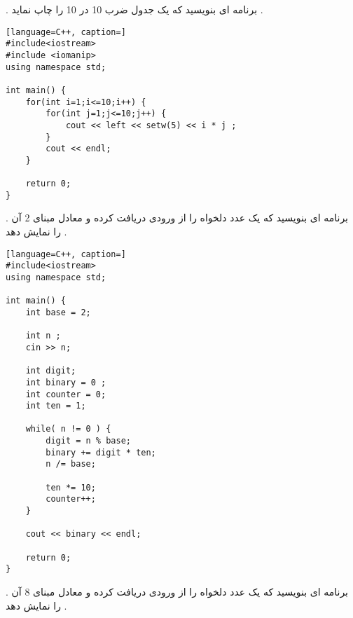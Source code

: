 \documentclass[12pt]{article}
\begin{document}
\newpage

 . برنامه ای بنویسید که یک جدول ضرب 10 در 10 را چاپ نماید .







\begin{latin}
\begin{lstlisting}[language=C++, caption=]
#include<iostream>
#include <iomanip>
using namespace std;

int main() {
	for(int i=1;i<=10;i++) {
		for(int j=1;j<=10;j++) {
			cout << left << setw(5) << i * j ;
		}
		cout << endl;
	}
	
	return 0;
}
\end{lstlisting}
\end{latin}







\newpage

 . برنامه ای بنویسید که یک عدد دلخواه را از ورودی دریافت کرده و معادل مبنای 2 آن را نمایش دهد .






\begin{latin}
\begin{lstlisting}[language=C++, caption=]
#include<iostream>
using namespace std;

int main() {
	int base = 2;
	
	int n ;
	cin >> n;
	
	int digit;
	int binary = 0 ;
	int counter = 0;
	int ten = 1;
	
	while( n != 0 ) {
		digit = n % base;
		binary += digit * ten;
		n /= base;
		
		ten *= 10;
		counter++;
	}
	
	cout << binary << endl;
	
	return 0;
}
\end{lstlisting}
\end{latin}







\newpage

 . برنامه ای بنویسید که یک عدد دلخواه را از ورودی دریافت کرده و معادل مبنای 8 آن را نمایش دهد .
\end{document}
